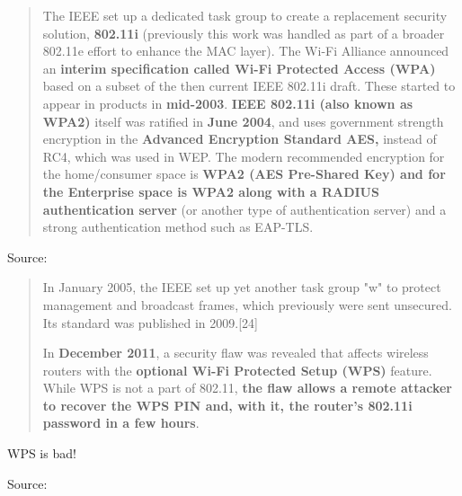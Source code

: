 \documentclass[Screen16to9,17pt]{foils}
\begin{document}

\begin{quote}
The IEEE set up a dedicated task group to create a replacement security solution, {\bf 802.11i} (previously this work was handled as part of a broader 802.11e effort to enhance the MAC layer). The Wi-Fi Alliance announced an {\bf interim specification called Wi-Fi Protected Access (WPA)} based on a subset of the then current IEEE 802.11i draft. These started to appear in products in {\bf mid-2003}. {\bf IEEE 802.11i (also known as WPA2)} itself was ratified in {\bf June 2004}, and uses government strength encryption in the {\bf Advanced Encryption Standard AES,} instead of RC4, which was used in WEP. The modern recommended encryption for the home/consumer space is {\bf WPA2 (AES Pre-Shared Key) and for the Enterprise space is WPA2 along with a RADIUS authentication server} (or another type of authentication server) and a strong authentication method such as EAP-TLS.
\end{quote}
Source: 


\begin{quote}
In January 2005, the IEEE set up yet another task group "w" to protect management and broadcast frames, which previously were sent unsecured. Its standard was published in 2009.[24]

In {\bf December 2011}, a security flaw was revealed that affects wireless routers with the {\bf optional Wi-Fi Protected Setup (WPS)} feature. While WPS is not a part of 802.11, {\bf the flaw allows a remote attacker to recover the WPS PIN and, with it, the router's 802.11i password in a few hours}.
\end{quote}

\vskip 2cm
\centerline{WPS is bad!}
\vskip 2cm

Source: 



\end{document}
